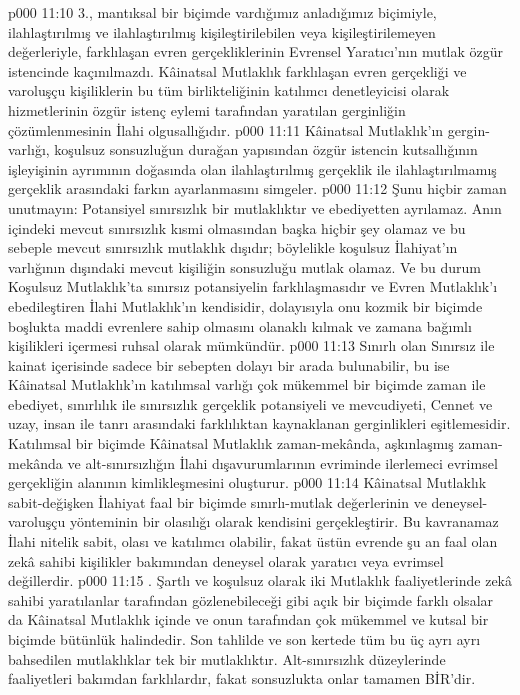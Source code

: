 \vs p000 11:10 3.\bibnobreakspace {}, mantıksal bir biçimde vardığımız anladığımız biçimiyle, ilahlaştırılmış ve ilahlaştırılmış kişileştirilebilen veya kişileştirilemeyen değerleriyle, farklılaşan evren gerçekliklerinin Evrensel Yaratıcı’nın mutlak özgür istencinde kaçınılmazdı. Kâinatsal Mutlaklık farklılaşan evren gerçekliği ve varoluşçu kişiliklerin bu tüm birlikteliğinin katılımcı denetleyicisi olarak hizmetlerinin özgür istenç eylemi tarafından yaratılan gerginliğin çözümlenmesinin İlahi olgusallığıdır.
\vs p000 11:11 Kâinatsal Mutlaklık’ın gergin\hyp{}varlığı, koşulsuz sonsuzluğun durağan yapısından özgür istencin kutsallığının işleyişinin ayrımının doğasında olan ilahlaştırılmış gerçeklik ile ilahlaştırılmamış gerçeklik arasındaki farkın ayarlanmasını simgeler.
\vs p000 11:12 Şunu hiçbir zaman unutmayın: Potansiyel sınırsızlık bir mutlaklıktır ve ebediyetten ayrılamaz. Anın içindeki mevcut sınırsızlık kısmi olmasından başka hiçbir şey olamaz ve bu sebeple mevcut sınırsızlık mutlaklık dışıdır; böylelikle koşulsuz İlahiyat’ın varlığının dışındaki mevcut kişiliğin sonsuzluğu mutlak olamaz. Ve bu durum Koşulsuz Mutlaklık'ta sınırsız potansiyelin farklılaşmasıdır ve Evren Mutlaklık’ı ebedileştiren İlahi Mutlaklık’ın kendisidir, dolayısıyla onu kozmik bir biçimde boşlukta maddi evrenlere sahip olmasını olanaklı kılmak ve zamana bağımlı kişilikleri içermesi ruhsal olarak mümkündür.
\vs p000 11:13 Sınırlı olan Sınırsız ile kainat içerisinde sadece bir sebepten dolayı bir arada bulunabilir, bu ise Kâinatsal Mutlaklık’ın katılımsal varlığı çok mükemmel bir biçimde zaman ile ebediyet, sınırlılık ile sınırsızlık gerçeklik potansiyeli ve mevcudiyeti, Cennet ve uzay, insan ile tanrı arasındaki farklılıktan kaynaklanan gerginlikleri eşitlemesidir. Katılımsal bir biçimde Kâinatsal Mutlaklık zaman\hyp{}mekânda, aşkınlaşmış zaman\hyp{}mekânda ve alt\hyp{}sınırsızlığın İlahi dışavurumlarının evriminde ilerlemeci evrimsel gerçekliğin alanının kimlikleşmesini oluşturur.
\vs p000 11:14 Kâinatsal Mutlaklık sabit\hyp{}değişken İlahiyat faal bir biçimde sınırlı\hyp{}mutlak değerlerinin ve deneysel\hyp{}varoluşçu yönteminin bir olasılığı olarak kendisini gerçekleştirir. Bu kavranamaz İlahi nitelik sabit, olası ve katılımcı olabilir, fakat üstün evrende şu an faal olan zekâ sahibi kişilikler bakımından deneysel olarak yaratıcı veya evrimsel değillerdir.
\vs p000 11:15 . Şartlı ve koşulsuz olarak iki Mutlaklık faaliyetlerinde zekâ sahibi yaratılanlar tarafından gözlenebileceği gibi açık bir biçimde farklı olsalar da Kâinatsal Mutlaklık içinde ve onun tarafından çok mükemmel ve kutsal bir biçimde bütünlük halindedir. Son tahlilde ve son kertede tüm bu üç ayrı ayrı bahsedilen mutlaklıklar tek bir mutlaklıktır. Alt\hyp{}sınırsızlık düzeylerinde faaliyetleri bakımdan farklılardır, fakat sonsuzlukta onlar tamamen BİR’dir.
